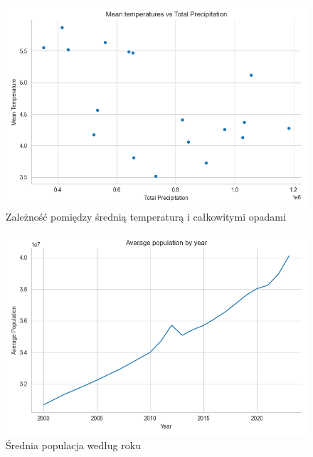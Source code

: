 \documentclass[9pt,a4paper,twoside]{rho}
\begin{document}
        \begin{figure}[H]
            \centering
            \includegraphics[width=1\columnwidth]{plots/Mean temperatures vs Total Precipitation.png}
            \caption{Zależność pomiędzy średnią temperaturą i całkowitymi opadami}
            \label{fig:mean_temperatures_vs_total_precipitation}
        \end{figure}
    
        \begin{figure}[H]
            \centering
            \includegraphics[width=1\columnwidth]{plots/Average population by year.png}
            \caption{Średnia populacja według roku}
            \label{fig:pop_by_year}
        \end{figure}
    
\end{document}
